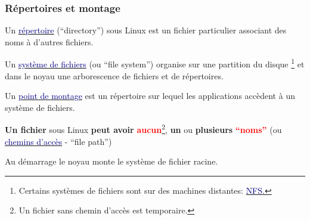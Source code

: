 \documentclass[lualatex,11pt,a4paper,svgnames,french]{beamer}
\newcommand{\clbrougras}[1]{{\textcolor{Red}{\textbf{#1}}}}
\begin{document}
\begin{frame}\frametitle{Répertoires et montage}

  Un
  {\href{https://fr.wikipedia.org/wiki/Répertoire_(informatique)}{\textcolor{Navy}{répertoire}}}
    (``directory'') sous Linux est un fichier particulier associant
    des noms à d'autres fichiers.

    \medskip
    
  Un
  {\href{https://fr.wikipedia.org/wiki/Système_de_fichiers}{\textcolor{Navy}{système
        de fichiers}}} (ou ``file system'') organise sur une partition
  du disque
  \footnote{Certains systèmes de fichiers sont sur des machines distantes:
  {\href{https://fr.wikipedia.org/wiki/Network_File_System}{\textcolor{Navy}{NFS}.\smallskip}}}
   et dans le noyau une arborescence de fichiers et de répertoires.

   \medskip

 Un
 {\href{https://fr.wikipedia.org/wiki/Point_de_montage}{\textcolor{Navy}{point
       de montage}}} est un répertoire sur lequel les applications accèdent à un
 système de fichiers.

 \medskip
 
\textbf{Un fichier} sous Linux \textbf{peut avoir}
\clbrougras{aucun}\footnote{Un fichier sans chemin d'accès est
temporaire.}, \textbf{un} ou \textbf{plusieurs} \clbrougras{``noms''}
(ou
           {\href{https://fr.wikipedia.org/wiki/Chemin_d'accès}{\textcolor{Navy}{chemins
                 d'accès}}} - ``file path'')
\medskip

Au démarrage le noyau monte le système de fichier racine.

\end{frame}
\end{document}
